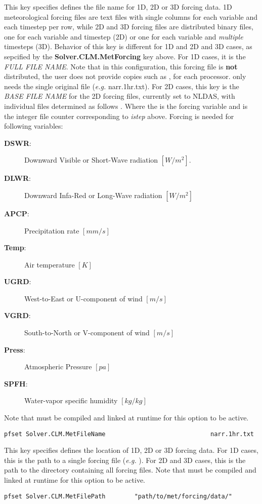 {This key specifies defines the file name for 1D, 2D or 3D forcing data.  1D meteorological forcing files are text files with single columns for each variable and each timestep per row, while 2D and 3D forcing files are distributed \parflow{} binary files, one for each variable and timestep (2D) or one for each variable and \emph{multiple} timesteps (3D). Behavior of this key is different for 1D and 2D and 3D cases, as sepcified by the {\bf Solver.CLM.MetForcing} key above. For 1D cases, it is the {\em FULL FILE NAME}. Note that in this configuration, this forcing file is {\bf not} distributed,  the user does not provide copies such as ,  for each processor.  \parflow{} only needs the single original file ({\em e.g.} narr.1hr.txt).  For 2D cases, this key is the {\em BASE FILE NAME} for the 2D forcing files, currently set to NLDAS, with individual files determined as follows . Where the  is the forcing variable and  is the integer file counter corresponding to {\em istep} above. Forcing is needed for following variables:
\begin{description}
\item[{\bf DSWR}: ] Downward Visible or Short-Wave radiation $[W/m^2]$.
\item[{\bf DLWR}: ] Downward Infa-Red or Long-Wave radiation $[W/m^2]$
\item[{\bf APCP}: ] Precipitation rate $[mm/s]$
\item[{\bf Temp}: ] Air temperature $[K]$
\item[{\bf UGRD}: ] West-to-East or U-component of wind $[m/s]$
\item[{\bf VGRD}: ] South-to-North or V-component of wind $[m/s]$
\item[{\bf Press}: ] Atmospheric Pressure $[pa]$
\item[{\bf SPFH}: ] Water-vapor specific humidity $[kg/kg]$
\label{clm_forcing}
\end{description}
Note that  must be compiled and linked at runtime for this option to be active.
}
\begin{display}\begin{verbatim}
pfset Solver.CLM.MetFileName                             narr.1hr.txt
\end{verbatim}\end{display}

{This key specifies defines the location of 1D, 2D or 3D forcing data. For 1D cases, this is the path to a single forcing file ({\em e.g.}  
). For 2D and 3D cases, this is the path to the directory  
containing all forcing files. Note that  must be compiled and linked at runtime for this option to be active.
}
\begin{display}\begin{verbatim}
pfset Solver.CLM.MetFilePath		"path/to/met/forcing/data/"
\end{verbatim}\end{display}

